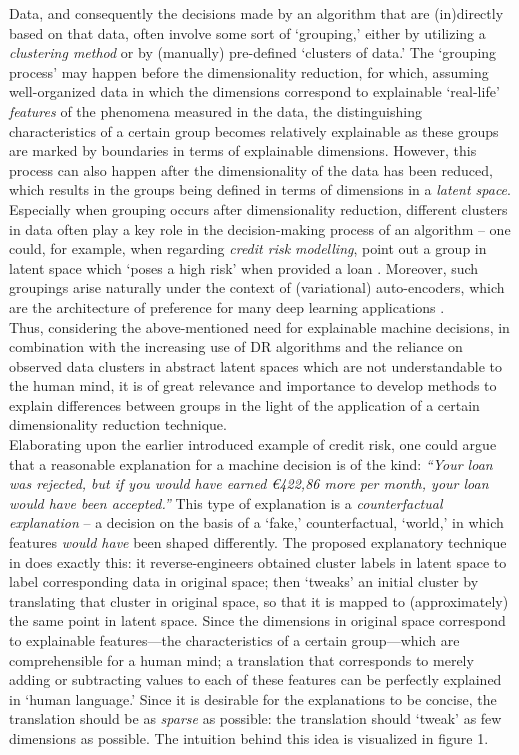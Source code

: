 Data, and consequently the decisions made by an algorithm that are (in)directly based on that data, often involve some sort of `grouping,' either by utilizing a \textit{clustering method} or by (manually) pre-defined `clusters of data.' The `grouping process' may happen before the dimensionality reduction, for which, assuming well-organized data in which the dimensions correspond to explainable `real-life' \textit{features} of the phenomena measured in the data, the distinguishing characteristics of a certain group becomes relatively explainable as these groups are marked by boundaries in terms of explainable dimensions. However, this process can also happen after the dimensionality of the data has been reduced, which results in the groups being defined in terms of dimensions in a \textit{latent space}. Especially when grouping occurs after dimensionality reduction, different clusters in data often play a key role in the decision-making process of an algorithm -- one could, for example, when regarding \textit{credit risk modelling}, point out a group in latent space which `poses a high risk' when provided a loan \cite{MANCISIDOR2021114020}. Moreover, such groupings arise naturally under the context of (variational) auto-encoders, which are the architecture of preference for many deep learning applications \cite[p.~8]{plumb2020explaining}.\\

Thus, considering the above-mentioned need for explainable machine decisions, in combination with the increasing use of DR algorithms and the reliance on observed data clusters in abstract latent spaces which are not understandable to the human mind, it is of great relevance and importance to develop methods to explain differences between groups in the light of the application of a certain dimensionality reduction technique.\\

Elaborating upon the earlier introduced example of credit risk, one could argue that a reasonable explanation for a machine decision is of the kind: \textit{``Your loan was rejected, but if you would have earned \euro422,86 more per month, your loan would have been accepted.''} This type of explanation is a \textit{counterfactual explanation} -- a decision on the basis of a `fake,' counterfactual, `world,' in which features \textit{would have} been shaped differently. The proposed explanatory technique in \cite{plumb2020explaining} does exactly this: it reverse-engineers obtained cluster labels in latent space to label corresponding data in original space; then `tweaks' an initial cluster by translating that cluster in original space, so that it is mapped to (approximately) the same point in latent space. Since the dimensions in original space correspond to explainable features---the characteristics of a certain group---which are comprehensible for a human mind; a translation that corresponds to merely adding or subtracting values to each of these features can be perfectly explained in `human language.' Since it is desirable for the explanations to be concise, the translation should be as \textit{sparse} as possible: the translation should `tweak' as few dimensions as possible. The intuition behind this idea is visualized in figure 1.

